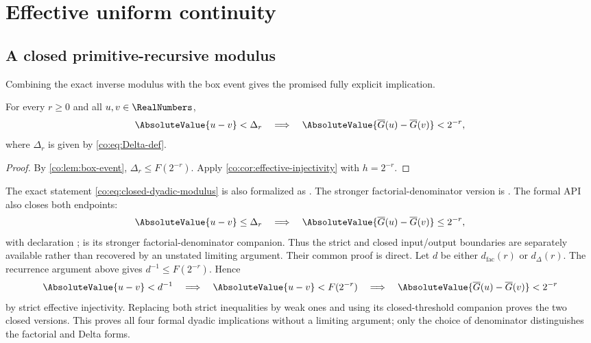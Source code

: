 \section{Effective uniform continuity}

\subsection{A closed primitive-recursive modulus}

Combining the exact inverse modulus with the box event gives the promised
fully explicit implication.

\begin{theorem}\label{co:thm:closed-dyadic-modulus}
For every $r\ge0$ and all $u,v\in\RealNumbers$,
\begin{equation}\label{co:eq:closed-dyadic-modulus}
 \AbsoluteValue{u-v}<\Delta_r
 \quad\Longrightarrow\quad
 \AbsoluteValue{\InvT(u)-\InvT(v)}<2^{-r},
\end{equation}
where $\Delta_r$ is given by \eqref{co:eq:Delta-def}.
\end{theorem}

\begin{proof}
By \cref{co:lem:box-event}, $\Delta_r\le F(2^{-r})$.  Apply
\cref{co:cor:effective-injectivity} with $h=2^{-r}$.
\end{proof}

The exact statement \eqref{co:eq:closed-dyadic-modulus} is also formalized as
.
The stronger factorial-denominator version is
.
The formal API also closes both endpoints:
\[
 \AbsoluteValue{u-v}\le\Delta_r
 \quad\Longrightarrow\quad
 \AbsoluteValue{\InvT(u)-\InvT(v)}\le2^{-r},
\]
with declaration
;
is its stronger factorial-denominator companion.  Thus the strict and closed
input/output boundaries are separately available rather than recovered by an
unstated limiting argument.  Their common proof is direct.  Let $d$ be either
$d_{\mathrm{fac}}(r)$ or $d_{\Delta}(r)$.  The recurrence argument above gives
$d^{-1}\le F(2^{-r})$.  Hence
\[
 \AbsoluteValue{u-v}<d^{-1}
 \quad\Longrightarrow\quad
 \AbsoluteValue{u-v}<F(2^{-r})
 \quad\Longrightarrow\quad
 \AbsoluteValue{\InvT(u)-\InvT(v)}<2^{-r}
\]
by strict effective injectivity.  Replacing both strict inequalities by weak
ones and using its closed-threshold companion proves the two closed versions.
This proves all four formal dyadic implications without a limiting argument;
only the choice of denominator distinguishes the factorial and Delta forms.

